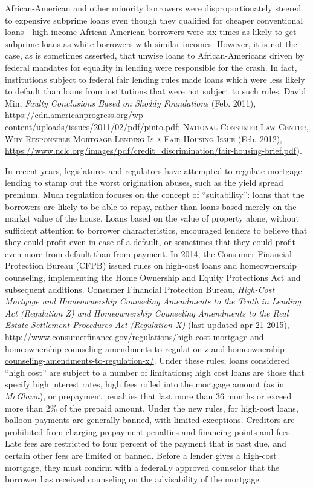 \item African-American and other minority borrowers were disproportionately
steered to expensive subprime loans even though they qualified for cheaper
conventional loans---high-income African American borrowers were six times as
likely to get subprime loans as white borrowers with similar incomes.  However,
it is not the case, as is sometimes asserted, that unwise loans to
African-Americans driven by federal mandates for equality in lending were
responsible for the crash.  In fact, institutions subject to federal fair
lending rules made loans which were less likely to default than loans from
institutions that were not subject to such rules.  David Min,
\emph{Faulty
Conclusions Based on Shoddy Foundations} (Feb. 2011),
\url{https://cdn.americanprogress.org/wp-content/uploads/issues/2011/02/pdf/pinto.pdf};
\textsc{National Consumer Law Center},
\textsc{Why
Responsible Mortgage Lending Is a Fair Housing Issue} (Feb. 2012),
\url{https://www.nclc.org/images/pdf/credit_discrimination/fair-housing-brief.pdf}).


\item In recent years, legislatures and regulators have attempted to regulate
mortgage lending to stamp out the worst origination abuses, such as the yield
spread premium.  Much regulation focuses on the concept of ``suitability'':
loans that the borrowers are likely to be able to repay, rather than loans
based merely on the market value of the house. Loans based on the value of
property alone, without sufficient attention to borrower characteristics,
encouraged lenders to believe that they could profit even in case of a default,
or sometimes that they could profit even more from default than from payment. 
In 2014, the Consumer Financial Protection Bureau (CFPB) issued rules on
high-cost
loans and homeownership counseling, implementing the Home Ownership and Equity
Protections Act and subsequent additions.
Consumer Financial Protection Bureau, \emph{High-Cost Mortgage and Homeownership
Counseling Amendments to the Truth in Lending Act (Regulation Z) and
Homeownership Counseling Amendments to the Real Estate Settlement Procedures Act
(Regulation X)} (last updated apr 21 2015),
\url{http://www.consumerfinance.gov/regulations/high-cost-mortgage-and-homeownership-counseling-amendments-to-regulation-z-and-homeownership-counseling-amendments-to-regulation-x/}.
Under these rules, loans considered ``high cost'' are subject to a number of
limitations; high cost loans are those that specify high interest rates, high
fees rolled into the mortgage amount (as in \textit{McGlawn}), or prepayment
penalties that last more than 36 months or exceed more than 2\% of the prepaid
amount.  Under the new rules, for high-cost loans, balloon payments are
generally banned, with limited exceptions.  Creditors are prohibited from
charging prepayment penalties and financing points and fees.  Late fees are
restricted to four percent of the payment that is past due, and certain other
fees are limited or banned.  Before a lender gives a high-cost mortgage, they
must confirm with a federally approved counselor that the borrower has received
counseling on the advisability of the mortgage.


